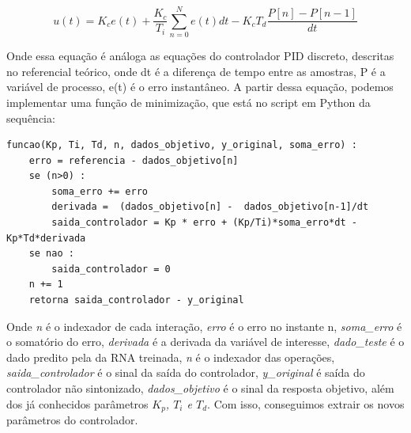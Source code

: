 \begin{equation}\label{eq:motor_accel}
u(t) = K_c e(t) + \frac{K_c}{T_i}\sum_{n=0}^{N}{e(t)dt}-K_cT_d\frac{P[n]-P[n-1]}{dt}
\end{equation}

Onde essa equação é análoga as equações do controlador PID discreto, descritas no referencial teórico, onde dt é a diferença de tempo entre as amostras, P é a variável de processo, e(t) é o erro instantâneo. A partir dessa equação, podemos implementar uma função de minimização, que está no script em Python da sequência:

\begin{lstlisting}[caption={Minimização da função do controlador PID}]
funcao(Kp, Ti, Td, n, dados_objetivo, y_original, soma_erro) :
    erro = referencia - dados_objetivo[n]
    se (n>0) :
        soma_erro += erro
        derivada =  (dados_objetivo[n] -  dados_objetivo[n-1]/dt
        saida_controlador = Kp * erro + (Kp/Ti)*soma_erro*dt - Kp*Td*derivada
    se nao :
        saida_controlador = 0
    n += 1
    retorna saida_controlador - y_original
\end{lstlisting}

Onde \textit{n} é o indexador de cada interação, \textit{erro} é o erro no instante n, \textit{soma\_erro} é o somatório do erro, \textit{derivada} é a derivada da variável de interesse, \textit{dado\_teste} é o dado predito pela da RNA treinada, \textit{n} é o indexador das operações, \textit{saida\_controlador} é o sinal da saída do controlador, \textit{y\_original} é saída do controlador não sintonizado, \textit{dados\_objetivo} é o sinal da resposta objetivo, além dos já conhecidos parâmetros \textit{$K_p$, $T_i$ e $T_d$}. Com isso, conseguimos extrair os novos parâmetros do controlador.
